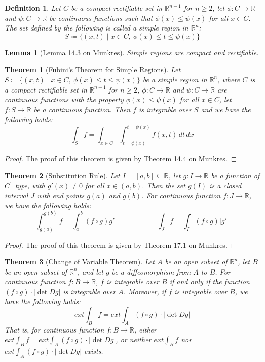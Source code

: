 \documentclass[15pt]{book}
\theoremstyle{break}
\theoremstyle{break}
\newtheorem{thm}{Theorem}[section]
\newtheorem{lem}{Lemma}[thm]
\newtheorem{defn}{Definition}[corL]
\newcommand{\R}{\mathbb{R}}
\begin{document}
\hfill\break
\begin{defn}
Let $C$ be a compact rectifiable set in $\R^{n-1}$ for $n \geq 2$, let $\phi:C \to \R$ and $\psi:C \to \R$ be continuous functions such that $\phi(x) \leq \psi(x)$ for all $x \in C$. The set defined by the following is called a simple region in $\R^n$:
$$S\coloneqq \{(x,t) \mid x \in C,\ \phi(x) \leq t \leq \psi(x)\}$$
\end{defn}

\hfill\break
\begin{lem}[Lemma 14.3 on Munkres]
Simple regions are compact and rectifiable.
\end{lem}

\begin{thm}[Fubini's Theorem for Simple Regions]
Let $S\coloneqq \{(x,t) \mid x \in C,\ \phi(x) \leq t \leq \psi(x)\}$ be a simple region in $\R^n$, where $C$ is a compact rectifiable set in $\R^{n-1}$ for $n \geq 2$, $\phi:C \to \R$ and $\psi:C \to \R$ are continuous functions with the property $\phi(x) \leq \psi(x)$ for all $x \in C$, let $f:S \to \R$ be a continuous function. Then $f$ is integrable over $S$ and we have the following holds: 
$$\int_S f = \int_{x \in C} \int_{t=\phi(x)}^{t=\psi(x)} f(x,t)\, dt\, dx$$
\end{thm}
\begin{proof}
The proof of this theorem is given by Theorem 14.4 on Munkres.
\end{proof}
\newpage

\begin{thm}[Substitution Rule]
Let $I = [a,b]\subseteq \R$, let $g:I \to \R$ be a function of $C^1$ type, with $g'(x) \neq 0$ for all $x \in (a,b)$. Then the set $g(I)$ is a closed interval $J$ with end points $g(a)$ and $g(b)$. For continuous function $f:J \to \R$, we have the following holds:
$$\int_{g(a)}^{g(b)} f = \int_a^b (f\circ g) g'\qquad\qquad\qquad \int_J f = \int_I (f\circ g)|g'|$$
\end{thm}
\begin{proof}
The proof of this theorem is given by Theorem 17.1 on Munkres.
\end{proof}


\begin{thm}[Change of Variable Theorem]
Let $A$ be an open subset of $\R^n$, let $B$ be an open subset of $\R^n$, and let $g$ be a diffeomorphism from $A$ to $B$. For continuous function $f:B\to \R$, $f$ is integrable over $B$ if and only if the function $(f\circ g) \cdot |\det Dg|$ is integrable over $A$. Moreover, if $f$ is integrable over $B$, we have the following holds:
$$ext \int_B f = ext \int_A (f\circ g) \cdot |\det Dg|$$ 
That is, for continuous function $f:B \to \R$, either $ext \int_B f = ext \int_A (f\circ g) \cdot |\det Dg|$, or neither $ext \int_B f$ nor $ext \int_A (f\circ g) \cdot |\det Dg|$ exists.
\end{thm}
\end{document}
